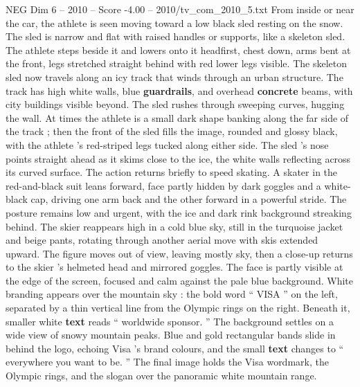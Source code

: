 \begin{textsample}{NEG Dim 6 – 2010 – Score -4.00 – 2010/tv\_com\_2010\_5.txt}
From inside or near the car, the athlete is seen moving toward a low black sled resting on the snow.
The sled is narrow and flat with raised handles or supports, like a skeleton sled.
The athlete steps beside it and lowers onto it headfirst, chest down, arms bent at the front, legs stretched straight behind with red lower legs visible.
The skeleton sled now travels along an icy track that winds through an urban structure.
The track has high white walls, blue \textbf{guardrails}, and overhead \textbf{concrete} beams, with city buildings visible beyond.
The sled rushes through sweeping curves, hugging the wall.
At times the athlete is a small dark shape banking along the far side of the track ; then the front of the sled fills the image, rounded and glossy black, with the athlete ’s red-striped legs tucked along either side.
The sled ’s nose points straight ahead as it skims close to the ice, the white walls reflecting across its curved surface.
The action returns briefly to speed skating.
A skater in the red-and-black suit leans forward, face partly hidden by dark goggles and a white-black cap, driving one arm back and the other forward in a powerful stride.
The posture remains low and urgent, with the ice and dark rink background streaking behind.
The skier reappears high in a cold blue sky, still in the turquoise jacket and beige pants, rotating through another aerial move with skis extended upward.
The figure moves out of view, leaving mostly sky, then a close-up returns to the skier ’s helmeted head and mirrored goggles.
The face is partly visible at the edge of the screen, focused and calm against the pale blue background.
White branding appears over the mountain sky : the bold word “ VISA ” on the left, separated by a thin vertical line from the Olympic rings on the right.
Beneath it, smaller white \textbf{text} reads “ worldwide sponsor. ” The background settles on a wide view of snowy mountain peaks.
Blue and gold rectangular bands slide in behind the logo, echoing Visa ’s brand colours, and the small \textbf{text} changes to “ everywhere you want to be. ” The final image holds the Visa wordmark, the Olympic rings, and the slogan over the panoramic white mountain range.

\end{textsample}
